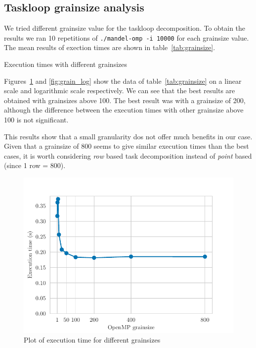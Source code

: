 \pagebreak
\subsection{Taskloop grainsize analysis}

We tried different grainsize value for the taskloop decomposition. To obtain the results we ran
10 repetitions of \texttt{./mandel-omp -i 10000} for each grainsize value. The mean results of
exection times are shown in table~\ref{tab:grainsize}.

\begin{table}[H]
    \caption{Execution times with different grainsizes}%
    \label{tab:grainsize}
    \begin{center}
    
    \end{center}
\end{table}

Figures~\ref{fig:grain} and \ref{fig:grain_log} show the data of table~\ref{tab:grainsize} on a linear scale and logarithmic
scale respectively. We can see that the best results are obtained with grainsizes above 100. The best result was
with a grainsize of 200, although the difference between the execution times with other grainsize above 100 is not
significant.

This results show that a small granularity dos not offer much benefits in our case. Given that a grainsize of 800
seems to give similar execution times than the best cases, it is worth considering \emph{row} based task decomposition
instead of \emph{point} based (since 1 row = 800).

\begin{figure}[H]
    \centering
    \includegraphics{plots/grainsize.pdf}
    \caption{Plot of execution time for different grainsizes}
    \label{fig:grain} 
\end{figure}

